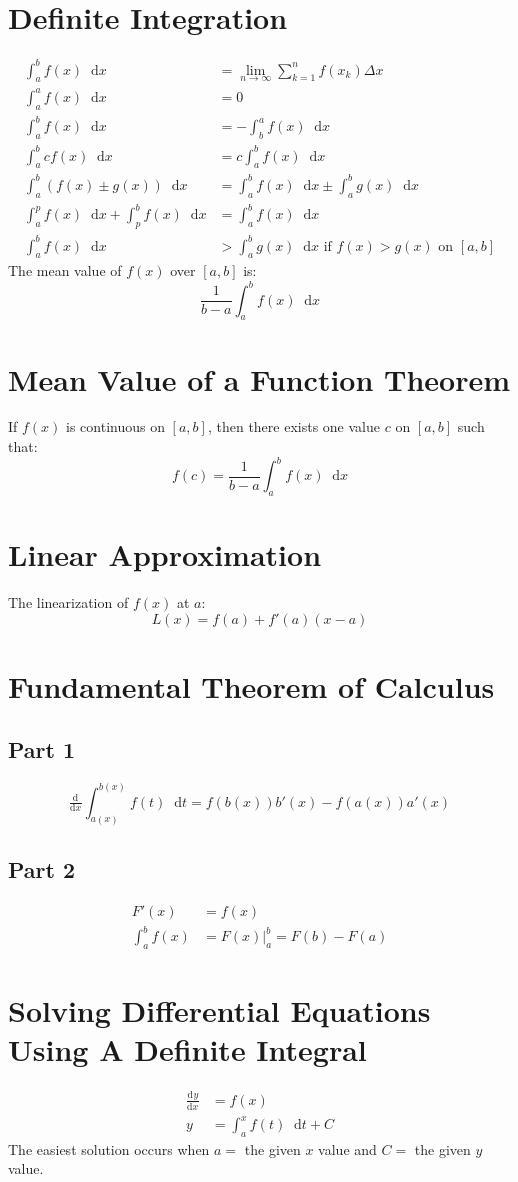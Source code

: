 \documentclass[12pt]{article}
\newcommand*{\rmaskip}{\setlength{\abovedisplayskip}{0pt}}
\newcommand*{\rmbskip}{\setlength{\belowdisplayskip}{0pt}}
\newcommand*{\rmskip}{\rmaskip \rmbskip}
\newcommand*{\dd}[3][]{\tfrac{\mathrm{d}^{#1}#2}{\mathrm{d}#3^{#1}}}
\newcommand*{\D}[1]{\mathop{}\!\mathrm{d} #1}
\begin{document}
\section*{Definite Integration}
{\rmaskip\begin{align*}
  \int_a^b f(x) \D{x} &= \lim_{n \to \infty} \sum_{k=1}^n f(x_k)\Delta x\\
  \int_a^a f(x) \D{x} &= 0\\
  \int_a^b f(x) \D{x} &= -\int_b^a f(x) \D{x}\\
  \int_a^b c f(x) \D{x} &= c \int_a^b f(x) \D{x}\\
  \int_a^b (f(x) \pm g(x)) \D{x} &= \int_a^b f(x) \D{x} \pm \int_a^b g(x)
    \D{x}\\
  \int_a^p f(x) \D{x} + \int_p^b f(x) \D{x} &= \int_a^b f(x) \D{x}\\
  \int_a^b f(x) \D{x} &> \int_a^b g(x) \D{x} \text{ if }f(x) > g(x)
    \text{ on } [a,b]
\end{align*}}%
The mean value of \(f(x)\) over \([a,b]\) is:
\[
  \frac{1}{b - a} \int_a^b f(x) \D{x}
\]
\section*{Mean Value of a Function Theorem}
If \(f(x)\) is continuous on \([a,b]\), then there exists one value \(c\) on
\([a,b]\) such that:
\[
  f(c) = \frac{1}{b - a} \int_a^b f(x) \D{x}
\]
\section*{Linear Approximation}
The linearization of \(f(x)\) at \(a\):
\[
  L(x) = f(a) + f'(a)(x-a)
\]
\section*{Fundamental Theorem of Calculus}
\subsection*{Part 1}
\[
  \dd{}{x} \int_{a(x)}^{b(x)} f(t) \D{t} = f(b(x)) b'(x) - f(a(x)) a'(x)
\]
\subsection*{Part 2}
{\rmskip\begin{align*}
  F'(x) &= f(x)\\
  \int_a^b f(x) &= F(x) \bigg|_a^b = F(b) - F(a)
\end{align*}}%
\section*{Solving Differential Equations Using A Definite Integral}
{\rmaskip\begin{align*}
  \dd{y}{x} &= f(x)\\
  y &= \int_a^x f(t) \D{t} + C
\end{align*}}%
The easiest solution occurs when \(a = \) the given \(x\) value and \(C = \)
the given \(y\) value.
\end{document}
